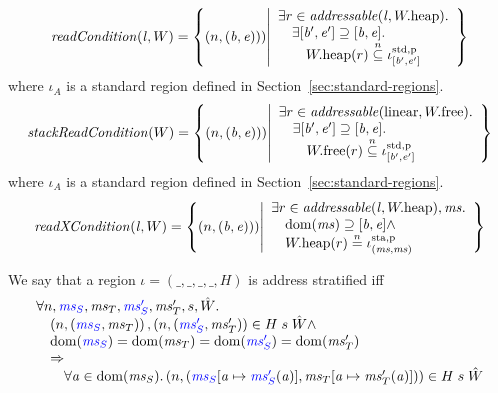\documentclass[a4paper]{article}
\begin{document}
\[
  \readCond{\lin,W} = \left\{ \npair{(\baddr,\eaddr})) \middle| 
    \begin{array}{l}
      \exists r \in \addressable{\lin, \pwheap} \ldotp \\
      \quad \exists [\baddr',\eaddr'] \supseteq [\baddr,\eaddr] \ldotp \\
      \qquad \pwheap(r) \nsubeq \stdreg{[\baddr',\eaddr']}{\pur}
    \end{array}
  \right\}
\]
where $\iota_A$ is a standard region defined in Section~\ref{sec:standard-regions}.
\[
  \stackReadCond{W} = \left\{ \npair{(\baddr,\eaddr})) \middle| 
    \begin{array}{l}
      \exists r \in \addressable{\linear, \pwfree} \ldotp \\
      \quad \exists [\baddr',\eaddr'] \supseteq [\baddr,\eaddr] \ldotp \\
      \qquad \pwfree(r) \nsubeq \stdreg{[\baddr',\eaddr']}{\pur}
    \end{array}
  \right\}
\]
where $\iota_A$ is a standard region defined in Section~\ref{sec:standard-regions}.
\[
  \xReadCond{\lin,W} = \left\{ \npair{(\baddr,\eaddr})) \middle| 
    \begin{array}{l}
      \exists r \in \addressable{\lin, \pwheap}, \ms \ldotp\\
      \quad \dom(\ms) \supseteq [\baddr,\eaddr] \wedge \\
      \quad \pwheap(r) \nequal \stareg[(\ms,\ms)]{\pur}
    \end{array}
  \right\}
\]


\begin{definition}
  \label{def:address-stratified}
  We say that a region $\iota = (\_,\_,\_,\_,H)$ is address stratified iff
  \[
    \begin{array}{l}
      \forall n, \src{\ms_S},\ms_T,\src{\ms_S'},\ms_T',s,\hat{W}\ldotp \\
      \quad \npair{\stpair{\ms}{\ms}}, \npair{\stpair[.]{\ms_S'}{\ms_T'}} \in H \; s \; \hat{W} \wedge \\
      \quad \dom(\src{\ms_S}) = \dom(\ms_T) = \dom(\src{\ms_S'}) = \dom(\ms_T') \\
      \quad \Rightarrow \\
      \qquad \forall \aaddr \in \dom(\ms_S) \ldotp \npair{(\src{\ms_S}\update{\aaddr}{\src{\ms_S'}(\aaddr)},\ms_T\update{\aaddr}{\ms_T'(\aaddr)})} \in H \; s \; \hat{W}
    \end{array}
  \]
\end{definition}
\end{document}

